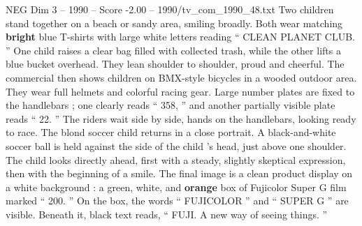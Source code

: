 \begin{textsample}{NEG Dim 3 – 1990 – Score -2.00 – 1990/tv\_com\_1990\_48.txt}
Two children stand together on a beach or sandy area, smiling broadly.
Both wear matching \textbf{bright} blue T-shirts with large white letters reading “ CLEAN PLANET CLUB. ” One child raises a clear bag filled with collected trash, while the other lifts a blue bucket overhead.
They lean shoulder to shoulder, proud and cheerful.
The commercial then shows children on BMX-style bicycles in a wooded outdoor area.
They wear full helmets and colorful racing gear.
Large number plates are fixed to the handlebars ; one clearly reads “ 358, ” and another partially visible plate reads “ 22. ” The riders wait side by side, hands on the handlebars, looking ready to race.
The blond soccer child returns in a close portrait.
A black-and-white soccer ball is held against the side of the child ’s head, just above one shoulder.
The child looks directly ahead, first with a steady, slightly skeptical expression, then with the beginning of a smile.
The final image is a clean product display on a white background : a green, white, and \textbf{orange} box of Fujicolor Super G film marked “ 200. ” On the box, the words “ FUJICOLOR ” and “ SUPER G ” are visible.
Beneath it, black text reads, “ FUJI.
A new way of seeing things. ”

\end{textsample}
